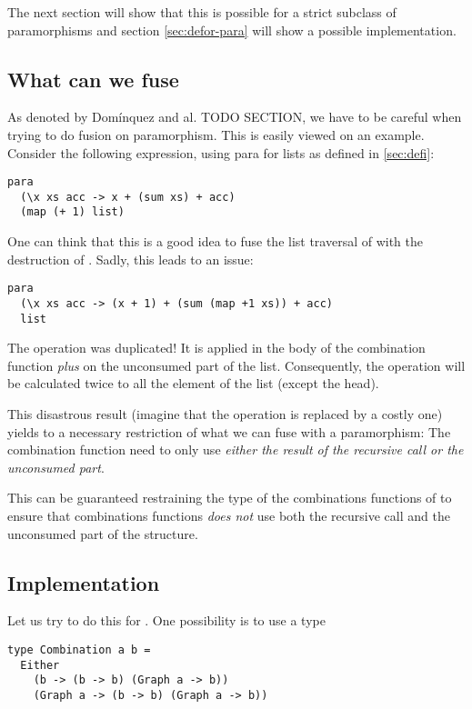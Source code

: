 The next section will show that this is possible for a strict subclass of paramorphisms and section \ref{sec:defor-para} will show a possible implementation.

\subsection{What can we fuse}

As denoted by Domínquez and al. \cite{paramorphismFusion} TODO SECTION, we have to be careful when trying to do fusion on paramorphism.
This is easily viewed on an example. Consider the following expression, using para for lists as defined in \ref{sec:defi}:
\begin{verbatim}
para
  (\x xs acc -> x + (sum xs) + acc)
  (map (+ 1) list)
\end{verbatim}

One can think that this is a good idea to fuse the list traversal of  with the destruction of . Sadly, this leads to an issue:

\begin{verbatim}
para
  (\x xs acc -> (x + 1) + (sum (map +1 xs)) + acc)
  list
\end{verbatim}

The  operation was duplicated! It is applied in the body of the combination function \emph{plus} on the unconsumed part of the list. Consequently, the  operation will be calculated twice to all the element of the list (except the head).

This disastrous result (imagine that the  operation is replaced by a costly one) yields to a necessary restriction of what we can fuse with a paramorphism:
The combination function need to only use \emph{either the result of the recursive call or the unconsumed part}.

This can be guaranteed restraining the type of the combinations functions of  to ensure that combinations functions \emph{does not} use both the recursive call and the unconsumed part of the structure.

\subsection{Implementation}

Let us try to do this for .
One possibility is to use a type
\begin{verbatim}
type Combination a b =
  Either
    (b -> (b -> b) (Graph a -> b))
    (Graph a -> (b -> b) (Graph a -> b))
\end{verbatim}

